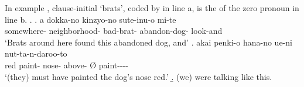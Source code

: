 In example \Next,
clause-initial  `brats', coded by  in line a, is the  of the zero pronoun in line b.
\largerpage
%
\ex.
 \ag. a dokka-no kinzyo-no  sute-inu-o mi-te \\
		 somewhere- neighborhood- bad-brat- abandon-dog- look-and \\
		`Brats around here found this abandoned dog, and'
 \bg. akai penki-o hana-no ue-ni \EM{\O} nut-ta-n-daroo-to \\
 	red paint- nose- above- {\O} paint---- \\
	`(they) must have painted the dog's nose red.'
 \b. (we) were talking like this.

